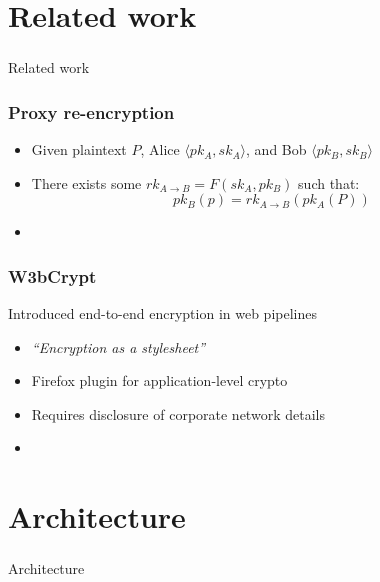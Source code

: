 \documentclass{beamer}
\begin{document}
\section{Related work}
\begin{frame}
\frametitle{}
\begin{center}
Related work
\end{center}
\end{frame}


\begin{frame}
\frametitle{Proxy re-encryption}
\begin{itemize}
\item Given plaintext $P$, Alice $\langle pk_A, sk_A \rangle$, and Bob
$\langle pk_B, sk_B \rangle$
\item There exists some $rk_{A \to B} = F(sk_A, pk_B)$ such that:
\begin{equation*}
pk_B(p) = rk_{A \to B}( pk_A (P))
\end{equation*}
\item \cite{atomic_proxy_reencryption} 
\end{itemize}
\end{frame}

\begin{frame}
\frametitle{W3bCrypt}
Introduced end-to-end encryption in web pipelines
\smallskip
\begin{itemize}
\item \emph{``Encryption as a stylesheet''}
\item Firefox plugin for application-level crypto
\item Requires disclosure of corporate network details
\item \cite{w3bcrypt} 
\end{itemize}
\end{frame}

\section{Architecture}
\begin{frame}
\frametitle{}
\begin{center}
Architecture
\end{center}
\end{frame}
\end{document}
